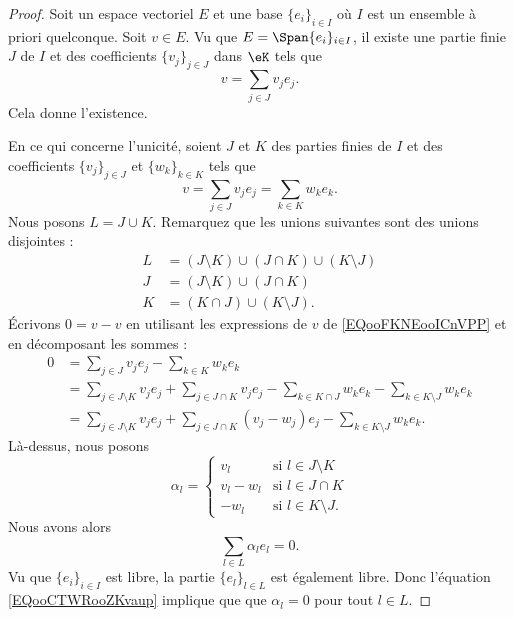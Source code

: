 \begin{proof}
	Soit un espace vectoriel \( E\) et une base \( \{ e_i \}_{i\in I}\) où \( I\) est un ensemble à priori quelconque. Soit \( v\in E\). Vu que \( E=\Span\{ e_i \}_{i\in I}\), il existe une partie finie \( J\) de \( I\) et des coefficients \( \{ v_j \}_{j\in J}\) dans \( \eK\) tels que
	\begin{equation}
		v=\sum_{j\in J}v_je_j.
	\end{equation}
	Cela donne l'existence.

	En ce qui concerne l'unicité, soient \( J \) et \( K\) des parties finies de \( I\) et des coefficients \( \{ v_j \}_{j\in J}\) et \( \{ w_{k} \}_{k\in K}\) tels que
	\begin{equation}        \label{EQooFKNEooICnVPP}
		v=\sum_{j\in J}v_je_j=\sum_{k\in K}w_{k}e_{k}.
	\end{equation}
	Nous posons \( L=J\cup K\). Remarquez que les unions suivantes sont des unions disjointes :
	\begin{subequations}
		\begin{align}
			L & =(J\setminus K)\cup (J\cap K)\cup (K\setminus J) \\
			J & =(J\setminus K)\cup (J\cap K)                    \\
			K & =(K\cap J)\cup(K\setminus J).
		\end{align}
	\end{subequations}
	Écrivons \( 0=v-v\) en utilisant les expressions de \( v\) de \eqref{EQooFKNEooICnVPP} et en décomposant les sommes :
	\begin{subequations}
		\begin{align}
			0 & =\sum_{j\in J}v_je_j-\sum_{k\in K}w_ke_k                                                                           \\
			  & =\sum_{j\in J\setminus K}v_je_j+\sum_{j\in J\cap K}v_je_j-\sum_{k\in K\cap J}w_ke_k-\sum_{k\in K\setminus J}w_ke_k \\
			  & =\sum_{j\in J\setminus K}v_je_j+\sum_{j\in J\cap K}(v_j-w_j)e_j-\sum_{k\in K\setminus J}w_ke_k.
		\end{align}
	\end{subequations}
	Là-dessus, nous posons
	\begin{equation}
		\alpha_l=\begin{cases}
			v_l     & \text{si } l\in J\setminus K \\
			v_l-w_l & \text{si } l\in J\cap K      \\
			-w_l    & \text{si }l\in K\setminus J.
		\end{cases}
	\end{equation}
	Nous avons alors
	\begin{equation}        \label{EQooCTWRooZKvaup}
		\sum_{l\in L}\alpha_le_l=0.
	\end{equation}
	Vu que \( \{ e_i \}_{i\in I}\) est libre, la partie \( \{ e_l \}_{l\in L}\) est également libre. Donc l'équation \eqref{EQooCTWRooZKvaup} implique que que \( \alpha_l=0\) pour tout \( l\in L\).


\end{proof}
